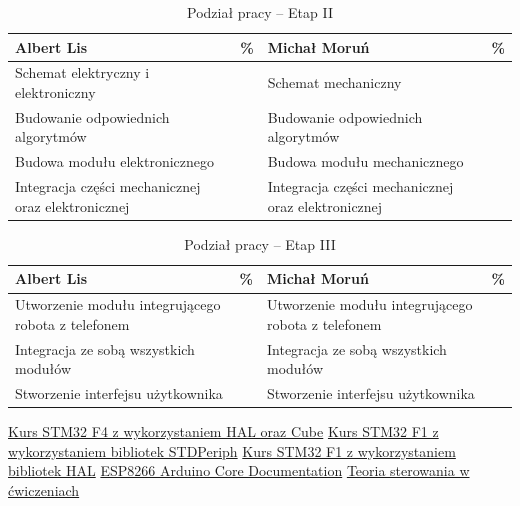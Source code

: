 \documentclass[10pt, a4paper]{article}
\begin{document}
\begin{table}[H]
	\centering
	\begin{tabular}{|L{7cm}|L{0.8cm}||L{7cm}|L{0.8cm}|}
		\hline
		\hline
		\textbf{Albert Lis} & 
		\% & 
		\textbf{Michał Moruń} & \%\\
		\hline
		\hline
		Schemat elektryczny i elektroniczny		& &	
		Schemat mechaniczny &\\
		\hline
		Budowanie odpowiednich algorytmów & &
		Budowanie odpowiednich algorytmów &\\
		\hline
		Budowa modułu elektronicznego & &
		Budowa modułu mechanicznego & \\
		\hline
		Integracja części mechanicznej oraz elektronicznej & & 
		Integracja części mechanicznej oraz elektronicznej &\\
		\hline
	\end{tabular}
	\caption{Podział pracy -- Etap II}
	\label{tab:PodzialPracyEtap2}
\end{table}

\begin{table}[H]
	\centering
	\begin{tabular}{|L{7cm}|L{0.8cm}||L{7cm}|L{0.8cm}|}
		\hline
		\hline
		\textbf{Albert Lis} & 
		\% & 
		\textbf{Michał Moruń} & \%\\
		\hline
		\hline
		Utworzenie modułu integrującego robota z telefonem & &	
		Utworzenie modułu integrującego robota z telefonem &\\
		\hline
		Integracja ze sobą wszystkich modułów & &
		Integracja ze sobą wszystkich modułów & \\
		\hline
		 Stworzenie interfejsu użytkownika & &
		 Stworzenie interfejsu użytkownika &\\
		\hline
	\end{tabular}
	\caption{Podział pracy -- Etap III}
	\label{tab:PodzialPracyEtap3}
\end{table}



\newpage
%
%
\begin{thebibliography}{9}
	
	\href{https://forbot.pl/blog/kurs-stm32-f4-1-czas-poznac-hal-spis-tresci-kursu-id14114}{Kurs STM32 F4 z wykorzystaniem HAL oraz Cube}
	\href{https://forbot.pl/blog/stm32-praktyce-1-platforma-srodowisko-id2733}{Kurs STM32 F1 z wykorzystaniem bibliotek STDPeriph}
	\href{https://forbot.pl/blog/kurs-stm32-f1-migracja-na-hal-wstep-spis-tresci-id23580} {Kurs STM32 F1 z wykorzystaniem bibliotek HAL}
	\href{https://media.readthedocs.org/pdf/arduino-esp8266/docs_to_readthedocs/arduino-esp8266.pdf} {ESP8266 Arduino Core Documentation}
	\href{https://docer.pl/doc/n5xcex8} {Teoria sterowania w ćwiczeniach}
	
\end{thebibliography}
\end{document}
